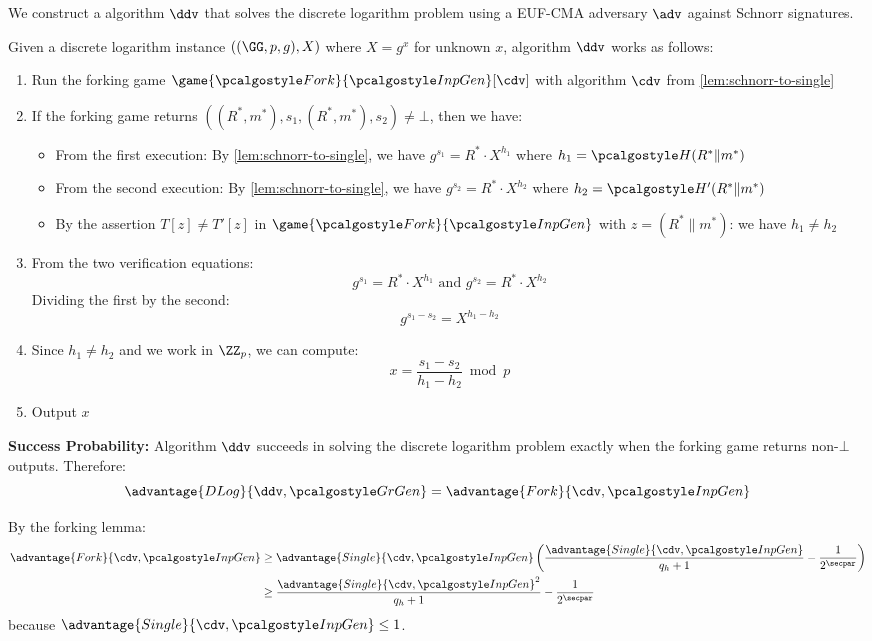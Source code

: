 \ifsolutions
\begin{mysolution}
  We construct a \ppt algorithm $\ddv$ that solves the discrete logarithm problem using a \ppt EUF-CMA adversary $\adv$ against Schnorr signatures.
  
  Given a discrete logarithm instance $((\GG, p, g), X)$ where $X = g^x$ for unknown $x$, algorithm $\ddv$ works as follows:
  \begin{enumerate}
    \item Run the forking game $\game{\algo{Fork}}{\algo{InpGen}}[\cdv]$ with algorithm $\cdv$ from \autoref{lem:schnorr-to-single}
    \item If the forking game returns $((R^*, m^*), s_1, (R^*, m^*), s_2) \neq \bot$, then we have:
    \begin{itemize}
      \item From the first execution: By \autoref{lem:schnorr-to-single}, we have $g^{s_1} = R^* \cdot X^{h_1}$ where $h_1 = \algo{H}(R^* \| m^*)$
      \item From the second execution: By \autoref{lem:schnorr-to-single}, we have $g^{s_2} = R^* \cdot X^{h_2}$ where $h_2 = \algo{H}'(R^* \| m^*)$
      \item By the assertion $T[z] \neq T'[z]$ in $\game{\algo{Fork}}{\algo{InpGen}}$ with $z = (R^* \| m^*)$: we have $h_1 \neq h_2$
    \end{itemize}
    \item From the two verification equations:
    \[
      g^{s_1} = R^* \cdot X^{h_1} \text{ and } g^{s_2} = R^* \cdot X^{h_2}
    \]
    Dividing the first by the second:
    \[
      g^{s_1 - s_2} = X^{h_1 - h_2}
    \]
    \item Since $h_1 \neq h_2$ and we work in $\ZZ_p$, we can compute:
    \[
      x = \frac{s_1 - s_2}{h_1 - h_2} \bmod p
    \]
    \item Output $x$
  \end{enumerate}
  
  \textbf{Success Probability:} Algorithm $\ddv$ succeeds in solving the discrete logarithm problem exactly when the forking game returns non-$\bot$ outputs. Therefore:
  \[
    \advantage{DLog}{\ddv, \grgen} = \advantage{Fork}{\cdv, \algo{InpGen}}
  \]
  
  By the forking lemma:
  \begin{align*}
    \advantage{Fork}{\cdv, \algo{InpGen}} &\geq \advantage{Single}{\cdv, \algo{InpGen}} \left( \frac{\advantage{Single}{\cdv, \algo{InpGen}}}{q_h + 1} - \frac{1}{2^\secpar} \right)\\
    &\geq  \frac{\advantage{Single}{\cdv, \algo{InpGen}}^2}{q_h + 1} - \frac{1}{2^\secpar}\\
  \end{align*}
  because $\advantage{Single}{\cdv, \algo{InpGen}} \leq 1$.
  

\end{mysolution}
